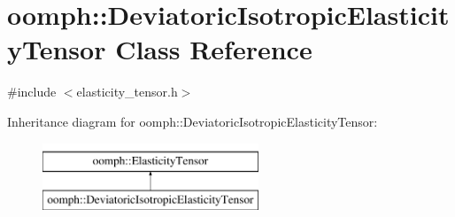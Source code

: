\hypertarget{classoomph_1_1DeviatoricIsotropicElasticityTensor}{}\section{oomph\+:\+:Deviatoric\+Isotropic\+Elasticity\+Tensor Class Reference}
\label{classoomph_1_1DeviatoricIsotropicElasticityTensor}


{\ttfamily \#include $<$elasticity\+\_\+tensor.\+h$>$}

Inheritance diagram for oomph\+:\+:Deviatoric\+Isotropic\+Elasticity\+Tensor\+:\begin{figure}[H]
\begin{center}
\leavevmode
\includegraphics[height=2.000000cm]{classoomph_1_1DeviatoricIsotropicElasticityTensor}
\end{center}
\end{figure}
